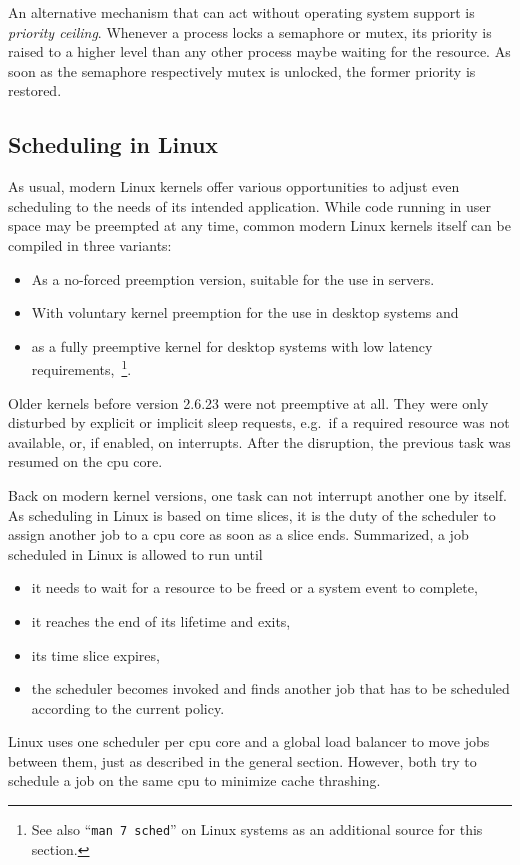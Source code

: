 An alternative mechanism that can act without operating system support is \textit{priority ceiling}.
Whenever a process locks a semaphore or mutex, its priority is raised to a higher level than any other process maybe waiting for the resource.
As soon as the semaphore respectively mutex is unlocked, the former priority is restored\cite{glatz2015betriebssysteme}.

 
\subsection{Scheduling in Linux}
As usual, modern Linux kernels offer various opportunities to adjust even scheduling to the needs of its intended application.
While code running in user space may be preempted at any time, common modern Linux kernels itself can be compiled in three variants:
\begin{itemize}
    \item As a no-forced preemption version, suitable for the use in servers.
    \item With voluntary kernel preemption for the use in desktop systems and
    \item as a fully preemptive kernel for desktop systems with low latency requirements\cite{lfd430},~\footnote{See also ``\texttt{man 7 sched}'' on Linux systems as an additional source for this section.}.
\end{itemize}
Older kernels before version 2.6.23 were not preemptive at all.
They were only disturbed by explicit or implicit sleep requests, e.g.\ if a required resource was not available, or, if enabled, on interrupts.
After the disruption, the previous task was resumed on the \ac{cpu} core.

Back on modern kernel versions, one task can not interrupt another one by itself.
As scheduling in Linux is based on time slices, it is the duty of the scheduler to assign another job to a \ac{cpu} core as soon as a slice ends.
Summarized, a job scheduled in Linux is allowed to run until
\begin{itemize}
    \item it needs to wait for a resource to be freed or a system event to complete,
    \item it reaches the end of its lifetime and exits,
    \item its time slice expires,
    \item the scheduler becomes invoked and finds another job that has to be scheduled according to the current policy\cite{lfd430}.
\end{itemize}
Linux uses one scheduler per \ac{cpu} core and a global load balancer to move jobs between them, just as described in the general section.
However, both try to schedule a job on the same \ac{cpu} to minimize cache thrashing\cite{lfd430}.

